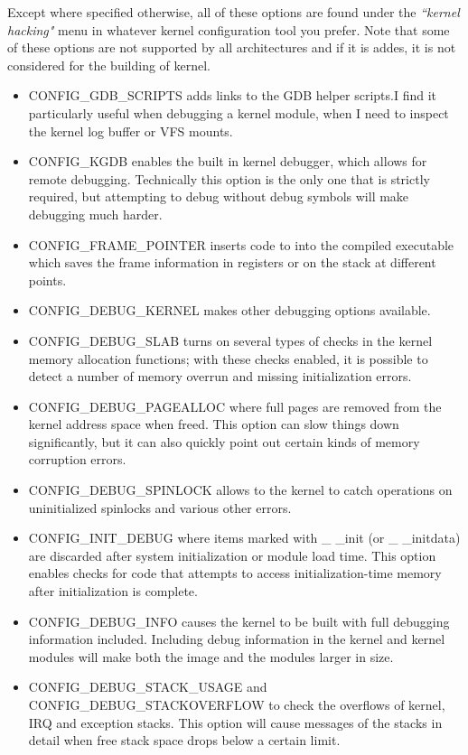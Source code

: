\documentclass{masterthesis}
\begin{document}
Except where specified otherwise, all of these options are found under the \emph{``kernel hacking"} menu in whatever kernel configuration tool you prefer. Note that some of these options are not supported by all architectures and if it is addes, it is not considered for the building of kernel.
\begin{itemize}
\item CONFIG_GDB_SCRIPTS adds links to the GDB helper scripts.I find it particularly useful when debugging a kernel module, when I need to inspect the kernel log buffer or VFS mounts.
\item CONFIG_KGDB enables the built in kernel debugger, which allows for remote debugging. Technically this option is the only one that is strictly required, but attempting to debug without debug symbols will make debugging much harder.
\item CONFIG_FRAME_POINTER inserts code to into the compiled executable which saves the frame information in registers or on the stack at different points.
\item CONFIG_DEBUG_KERNEL makes other debugging options available.
\item CONFIG_DEBUG_SLAB turns on several types of checks in the kernel memory allocation functions; with these checks enabled, it is possible to detect a number of memory overrun and missing initialization errors. 
\item CONFIG_DEBUG_PAGEALLOC where full pages are removed from the kernel address space when freed. This option can slow things down significantly, but it can also quickly point out certain kinds of memory corruption errors.
\item CONFIG_DEBUG_SPINLOCK allows to the kernel to catch operations on uninitialized spinlocks and various other errors.
\item CONFIG_INIT_DEBUG where items marked with _ _init (or _ _initdata) are discarded after system initialization or module load time. This option enables checks for code that attempts to access initialization-time memory after initialization is complete.
\item CONFIG_DEBUG_INFO causes the kernel to be built with full debugging information included. Including debug information in the kernel and kernel modules will make both the image and the modules larger in size.
\item CONFIG_DEBUG_STACK_USAGE and CONFIG_DEBUG_STACKOVERFLOW to check the overflows of kernel, IRQ and exception stacks. This option will cause messages of the stacks in detail when free stack space drops below a certain limit.

\end{itemize}
\end{document}
